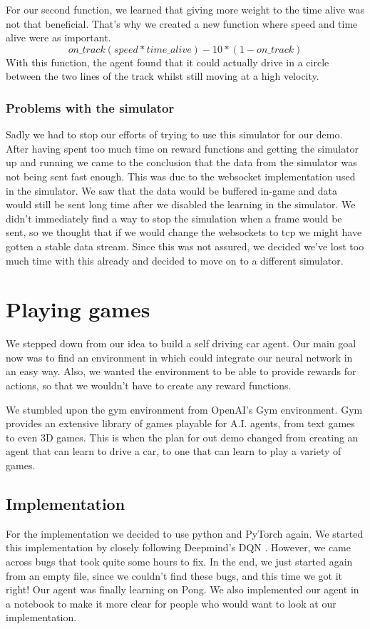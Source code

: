 \documentclass[12pt, conference, compsoc]{IEEEtran}
\begin{document}
For our second function, we learned that giving more weight to the time alive was not that beneficial. That's why we created a new function where speed and time alive were as important.
$$on\_track(speed * time\_alive ) - 10*(1-on\_track)$$
With this function, the agent found that it could actually drive in a circle between the two lines of the track whilst still moving at a high velocity.

\subsubsection{Problems with the simulator}
Sadly we had to stop our efforts of trying to use this simulator for our demo.
After having spent too much time on reward functions and getting the simulator up and running we came to the conclusion that the data from the simulator was not being sent fast enough.
This was due to the websocket implementation used in the simulator.
We saw that the data would be buffered in-game and data would still be sent long time after we disabled the learning in the simulator.
We didn't immediately find a way to stop the simulation when a frame would be sent, so we thought that if we would change the websockets to tcp we might have gotten a stable data stream. Since this was not assured, we decided we've lost too much time with this already and decided to move on to a different simulator.

\section{Playing games}
We stepped down from our idea to build a self driving car agent. Our main goal now was to find an environment in which could integrate our neural network in an easy way. Also, we wanted the environment to be able to provide rewards for actions, so that we wouldn't have to create any reward functions.

We stumbled upon the gym environment from OpenAI's \cite{openai-gym} Gym environment. Gym provides an extensive library of games playable for A.I. agents, from text games to even 3D games. This is when the plan for out demo changed from creating an agent that can learn to drive a car, to one that can learn to play a variety of games.

\subsection{Implementation}
For the implementation we decided to use python and PyTorch \cite{PyTorch} again. We started this implementation by closely following Deepmind's DQN \cite{mnih2015humanlevel}. However, we came across bugs that took quite some hours to fix. In the end, we just started again from an empty file, since we couldn't find these bugs, and this time we got it right! Our agent was finally learning on Pong. We also implemented our agent in a notebook to make it more clear for people who would want to look at our implementation. %
\end{document}
